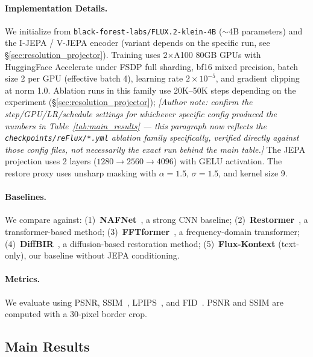 \documentclass{article}
\begin{document}
\paragraph{Implementation Details.}
We initialize from \texttt{black-forest-labs/FLUX.2-klein-4B} ($\sim$4B parameters) and the I-JEPA / V-JEPA encoder (variant depends on the specific run, see \S\ref{sec:resolution_projector}). Training uses 2$\times$A100 80GB GPUs with HuggingFace Accelerate under FSDP full sharding, bf16 mixed precision, batch size 2 per GPU (effective batch 4), learning rate $2 \times 10^{-5}$, and gradient clipping at norm 1.0. Ablation runs in this family use 20K--50K steps depending on the experiment (\S\ref{sec:resolution_projector}); \textit{[Author note: confirm the step/GPU/LR/schedule settings for whichever specific config produced the numbers in Table~\ref{tab:main_results} --- this paragraph now reflects the \texttt{checkpoints/reFlux/*.yml} ablation family specifically, verified directly against those config files, not necessarily the exact run behind the main table.]} The JEPA projection uses 2 layers ($1280 \to 2560 \to 4096$) with GELU activation. The restore proxy uses unsharp masking with $\alpha=1.5$, $\sigma=1.5$, and kernel size 9.

\paragraph{Baselines.}
We compare against: (1)~\textbf{NAFNet}~\cite{chen2022nafnet}, a strong CNN baseline; (2)~\textbf{Restormer}~\cite{zamir2022restormer}, a transformer-based method; (3)~\textbf{FFTformer}~\cite{kong2023efficient}, a frequency-domain transformer; (4)~\textbf{DiffBIR}~\cite{lin2023diffbir}, a diffusion-based restoration method; (5)~\textbf{Flux-Kontext} (text-only), our baseline without JEPA conditioning.

\paragraph{Metrics.}
We evaluate using PSNR, SSIM~\cite{wang2004image}, LPIPS~\cite{zhang2018unreasonable}, and FID~\cite{heusel2017gans}. PSNR and SSIM are computed with a 30-pixel border crop.

\subsection{Main Results}
\end{document}
